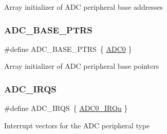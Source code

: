 Array initializer of A\+DC peripheral base addresses \mbox{\label{group___a_d_c___peripheral___access___layer_gaaa8175a3a2f4efaceeed5bd26c0b2d3f}} 
\subsubsection{\texorpdfstring{ADC\_BASE\_PTRS}{ADC\_BASE\_PTRS}}
{\footnotesize\ttfamily \#define A\+D\+C\+\_\+\+B\+A\+S\+E\+\_\+\+P\+T\+RS~\{ \mbox{\hyperlink{group___a_d_c___peripheral___access___layer_ga0d2ea0f4a8dd17bf08e69d05deacbcb5}{A\+D\+C0}} \}}

Array initializer of A\+DC peripheral base pointers \mbox{\label{group___a_d_c___peripheral___access___layer_ga87c1a48633af604e5c7c6a64383398b9}} 
\subsubsection{\texorpdfstring{ADC\_IRQS}{ADC\_IRQS}}
{\footnotesize\ttfamily \#define A\+D\+C\+\_\+\+I\+R\+QS~\{ \mbox{\hyperlink{group___interrupt__vector__numbers_gga666eb0caeb12ec0e281415592ae89083a08b6c660bfe015ac0842ca95510420eb}{A\+D\+C0\+\_\+\+I\+R\+Qn}} \}}

Interrupt vectors for the A\+DC peripheral type 